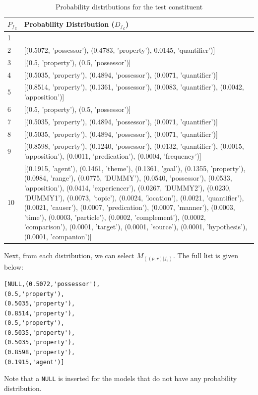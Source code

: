 \begin{table}[!h]
\small
\begin{tabular}{|l|p{6.3cm}|}
\hline \bf ${P_f}_c$ & \bf  Probability Distribution (${D_f}_c$) \\ 
\hline 1 &  \\ 
\hline 2 & [(0.5072, 'possessor'), (0.4783, 'property'), 0.0145, 'quantifier')]\\ 
\hline 3 & [(0.5, 'property'), (0.5, 'possessor')] \\ 
\hline 4 & [(0.5035, 'property'), (0.4894, 'possessor'), (0.0071, 'quantifier')] \\ 
\hline 5 & [(0.8514, 'property'), (0.1361, 'possessor'), (0.0083, 'quantifier'), (0.0042, 'apposition')]\\ 
\hline 6 & [(0.5, 'property'), (0.5, 'possessor')]\\ 
\hline 7 & [(0.5035, 'property'), (0.4894, 'possessor'), (0.0071, 'quantifier')] \\ 
\hline 8 & [(0.5035, 'property'), (0.4894, 'possessor'), (0.0071, 'quantifier')]\\ 
\hline 9 &[(0.8598, 'property'), (0.1240, 'possessor'), (0.0132, 'quantifier'), (0.0015, 'apposition'), (0.0011, 'predication'), (0.0004, 'frequency')]\\ 
\hline 10 & [(0.1915, 'agent'), (0.1461, 'theme'), (0.1361, 'goal'), (0.1355, 'property'), (0.0984, 'range'), (0.0775, 'DUMMY'), (0.0540, 'possessor'), (0.0533, 'apposition'), (0.0414, 'experiencer'), (0.0267, 'DUMMY2'), (0.0230, 'DUMMY1'), (0.0073, 'topic'), (0.0024, 'location'), (0.0021, 'quantifier'), (0.0021, 'causer'), (0.0007, 'predication'), (0.0007, 'manner'), (0.0003, 'time'), (0.0003, 'particle'), (0.0002, 'complement'), (0.0002, 'comparison'), (0.0001, 'target'), (0.0001, 'source'), (0.0001, 'hypothesis'), (0.0001, 'companion')] \\ 
\hline 
\end{tabular}  
\caption{Probability distributions for the test constituent}
\end{table}
\noindent Next, from each distribution, we can select $M_{((p,r)|f_c)}$. The full list is given below:
\begin{verbatim}
[NULL,(0.5072,'possessor'),
(0.5,'property'),
(0.5035,'property'),
(0.8514,'property'),
(0.5,'property'),
(0.5035,'property'),
(0.5035,'property'),
(0.8598,'property'),
(0.1915,'agent')]
\end{verbatim}
Note that a \verb+NULL+ is inserted for the models that do not have any probability distribution.\\
